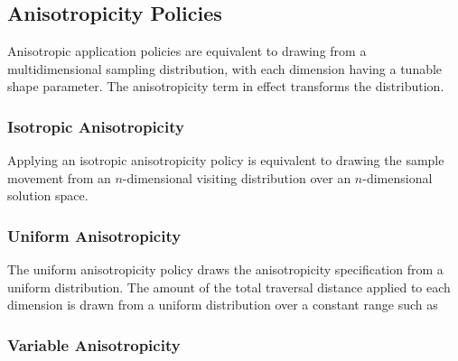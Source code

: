 \documentclass[11pt]{afthesis}
\begin{document}
	\subsection{Anisotropicity Policies}
	
	
	
	Anisotropic application policies are equivalent to drawing from a multidimensional sampling distribution, with each dimension having a tunable shape parameter. The anisotropicity term in effect transforms the distribution.
	
	\subsubsection{Isotropic Anisotropicity}
	
	
	Applying an isotropic anisotropicity policy is equivalent to drawing the sample movement from an \begin{math}n\end{math}-dimensional visiting distribution over an \begin{math}n\end{math}-dimensional solution space.
	
	\subsubsection{Uniform Anisotropicity}
	
	The uniform anisotropicity policy draws the anisotropicity specification from a uniform distribution. The amount of the total traversal distance applied to each dimension is drawn from a uniform distribution over a constant range such as \begin{math}[0,1]\end{math}
	
	\subsubsection{Variable Anisotropicity}
	
	
	
\end{document}
